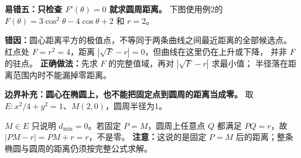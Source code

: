 \begin{trapbox}
\begin{minipage}{\linewidth}
\textbf{易错五：只检查 $F'(\theta)=0$ 就求圆周距离。}
下图使用例2的 $F(\theta)=3\cos^2\theta-4\cos\theta+2$ 和 $r=2$。

\end{minipage}
\textbf{错因：}圆心距离平方的极值点，不等同于两条曲线之间最近距离的全部候选点。
红点处 $F=r^2=4$，距离 $|\sqrt F-r|=0$，但曲线在这里仍在上升或下降，
并非 $F$ 的驻点。
\textbf{正确做法：}先求 $F$ 的完整值域，再对 $|\sqrt F-r|$ 求最小值；
半径落在距离范围内时不能漏掉零距离。
\end{trapbox}

\begin{trapbox}
\begin{minipage}{\linewidth}
\textbf{边界补充：圆心在椭圆上，也不能把固定点到圆周的距离当成零。}
取 $E:x^2/4+y^2=1$、$M(2,0)$，圆周半径为1。

\end{minipage}
$M\in E$ 只说明 $d_{\min}=0$。若固定 $P=M$，圆周上任意点 $Q$ 都满足
$PQ=r$，故 $|PM-r|=PM+r=r$，不是零。
\textbf{注意：}这说的是固定 $P=M$ 后的距离；整条椭圆与圆周的距离仍须按完整公式求解。
\end{trapbox}

